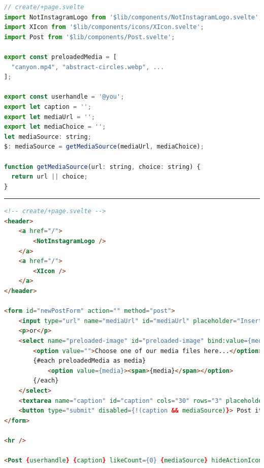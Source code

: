 \documentclass[a4paper, 12pt]{article}
\makeatletter
\renewcommand\listoffigures{%
  \section{\listfigurename}%
  \@mkboth{\MakeUppercase\listfigurename}{\MakeUppercase\listfigurename}%
  \@starttoc{lof}%
}
\makeatother
\begin{document}
\begin{lstlisting}[caption=Create in Svelte (Script), label={lst:Svelte:Create:Script}, language=JavaScript]
// create/+page.svelte
import NotInstagramLogo from '$lib/components/NotInstagramLogo.svelte';
import XIcon from '$lib/components/icons/XIcon.svelte';
import Post from '$lib/components/Post.svelte';

export const preloadedMedia = [
  "canyon.mp4", "abstract-circles.webp", ...
];

export const userhandle = '@you';
export let caption = '';
export let mediaUrl = '';
export let mediaChoice = '';
let mediaSource: string;
$: mediaSource = getMediaSource(mediaUrl, mediaChoice);

function getMediaSource(url: string, choice: string) {
  return url || choice;
}
\end{lstlisting}

\vspace{0.5cm} \hrule \vspace{0.5cm}

\begin{lstlisting}[caption=Create in Svelte (Template), label={lst:Svelte:Create:Template}, language=HTML, firstnumber=20]
<!-- create/+page.svelte -->
<header>
	<a href="/">
		<NotInstagramLogo />
	</a>
	<a href="/">
		<XIcon />
	</a>
</header>

<form id="newPostForm" action="" method="post">
	<input type="url" name="mediaUrl" id="mediaUrl" placeholder="Insert your media URL here..." bind:value={mediaUrl}/>
	<p>or</p>
	<select name="preloaded-image" id="preloaded-image" bind:value={mediaChoice}>
		<option value="">Choose one of our media files here...</option>
		{#each preloadedMedia as media}
			<option value={media}><span>{media}</span></option>
		{/each}
	</select>
	<textarea name="caption" id="caption" cols="30" rows="3" placeholder="Type your caption here" bind:value={caption} />
	<button type="submit" disabled={!(caption && mediaSource)}> Post it! </button>
</form>

<hr />

<Post {userhandle} {caption} likeCount={0} {mediaSource} hideActionIcons={true} />
\end{lstlisting}

\pagebreak

\listoffigures

\pagebreak

\glsaddall
\printnoidxglossary[
  type=\acronymtype,
  nonumberlist,
  style=long
]
\end{document}
